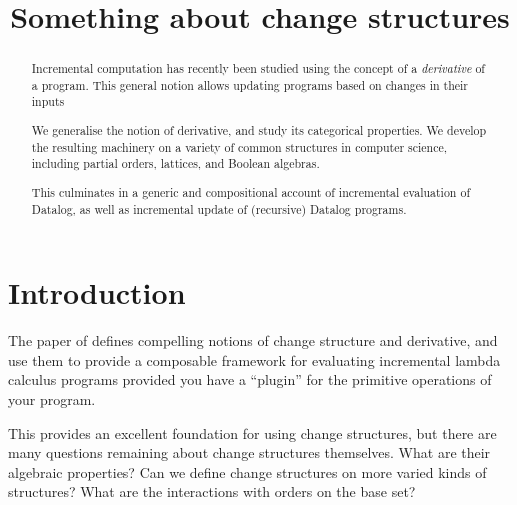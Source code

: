 
%


\usepackage{amsmath}
\usepackage{amsthm}
\usepackage{amssymb}
\usepackage{mathtools}
\usepackage{stmaryrd}
\usepackage{biblatex}
\usepackage{hyperref}
\usepackage{cleveref}







%


\begin{abstract}
  Incremental computation has recently been studied using the concept of a
  \textit{derivative} of a program. This general notion allows updating programs
  based on changes in their inputs

  We generalise the notion of derivative, and study its categorical
  properties. We develop the resulting machinery on a variety of common structures
  in computer science, including partial orders, lattices, and Boolean algebras.

  This culminates in a generic and compositional account of incremental evaluation of Datalog, as
  well as incremental update of (recursive) Datalog programs.
\end{abstract}

\title{Something about change structures}

\maketitle

\section{Introduction}

The paper of \textcite{cai2014changes} defines compelling notions
of change structure and derivative, and use them to provide a composable framework for
evaluating incremental lambda calculus programs provided you have a ``plugin'' for the
primitive operations of your program.

This provides an excellent foundation for using change structures, but there are
many questions remaining about change structures themselves. What are their
algebraic properties? Can we define change structures on more varied kinds of
structures? What are the interactions with orders on the base set?


